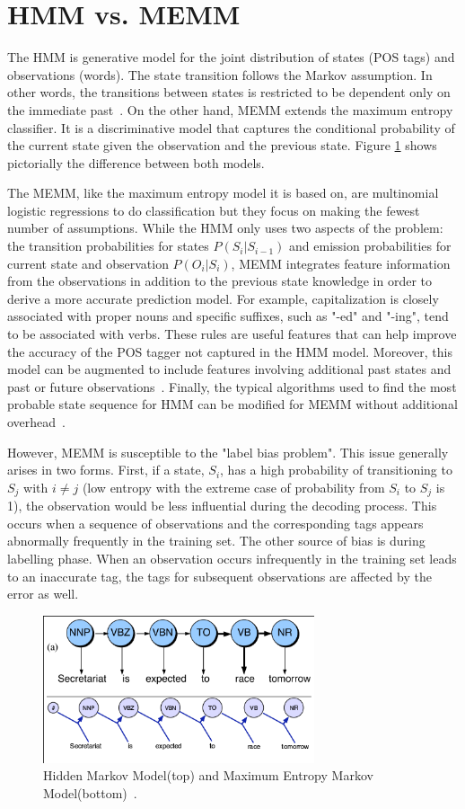 \section{HMM vs. MEMM}
The HMM is generative model for the joint distribution of states (POS tags) and observations (words). The state transition follows the Markov assumption. In other words, the transitions between states is restricted to be dependent only on the immediate past~\cite{nlpBook}. On the other hand, MEMM extends the maximum entropy classifier. It is a discriminative model that captures the conditional probability of the current state given the observation and the previous state. Figure \ref{hmmVmemm} shows pictorially the difference between both models.

The MEMM, like the maximum entropy model it is based on, are multinomial logistic regressions to do classification but they focus on making the fewest number of assumptions. While the HMM only uses two aspects of the problem: the transition probabilities for states $P( S_i | S_{i-1} )$ and emission probabilities for current state and observation $P( O_i | S_i )$, MEMM integrates feature information from the observations in addition to the previous state knowledge in order to derive a more accurate prediction model. For example, capitalization is closely associated with proper nouns and specific suffixes, such as "-ed" and "-ing", tend to be associated with verbs. These rules are useful features that can help improve the accuracy of the POS tagger not captured in the HMM model. Moreover, this model can be augmented to include features involving additional past states and past or future observations~\cite{nlpBook}. Finally, the typical algorithms used to find the most probable state sequence for HMM can be modified for MEMM without additional overhead~\cite{memmPaper}.

However, MEMM is susceptible to the "label bias problem". This issue generally arises in two forms. First, if a state, $S_i$, has a high probability of transitioning to $S_j$ with $i \neq j$ (low entropy with the extreme case of probability from $S_i$ to $S_j$ is 1), the observation would be less influential during the decoding process. This occurs when a sequence of observations and the corresponding tags appears abnormally frequently in the training set. The other source of bias is during labelling phase. When an observation occurs infrequently in the training set leads to an inaccurate tag, the tags for subsequent observations are affected by the error as well. \cite{labelBiasProblem}

\begin{figure}[ht]
\centering
\includegraphics[width=80mm]{figures/memm.png}
\caption{Hidden Markov Model(top) and Maximum Entropy Markov Model(bottom)~\cite{nlpBook}. \label{hmmVmemm}}
\end{figure}
